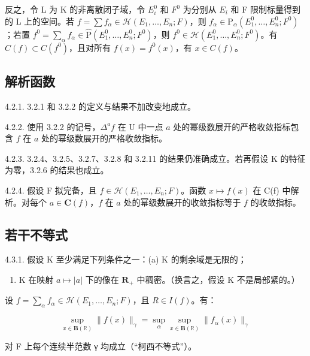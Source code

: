 反之，令 L 为 K 的非离散闭子域，令 \(E_{i}^{0}\) 和 \(F^{0}\) 为分别从 \(E_{i}\) 和 F 限制标量得到的 L 上的空间。若 \(f = \sum f_{\alpha} \in \mathcal{H}(E_{1}, \ldots, E_{n}; F)\)，则 \(f_{\alpha} \in \mathrm{P}_{\alpha}(E_{1}^{0}, \ldots, E_{n}^{0}; F^{0})\)；若置 \(f^{0} = \sum_{\alpha} f_{\alpha} \in \hat{\mathrm{P}}(E_{1}^{0}, \ldots, E_{n}^{0}; F^{0})\)，则 \(f^{0} \in \mathcal{H}(E_{1}^{0}, \ldots, E_{n}^{0}; F^{0})\)。有 \(C(f) \subset C(f^{0})\)，且对所有 \(f(x) = f^{0}(x)\)，有 \(x \in C(f)\)。

\subsection{解析函数}

4.2.1. 3.2.1 和 3.2.2 的定义与结果不加改变地成立。

4.2.2. 使用 3.2.2 的记号，\(\Delta^{a}f\) 在 U 中一点 \(a\) 处的幂级数展开的严格收敛指标包含 \(f\) 在 \(a\) 处的幂级数展开的严格收敛指标。

4.2.3. 3.2.4、3.2.5、3.2.7、3.2.8 和 3.2.11 的结果仍准确成立。若再假设 K 的特征为零，3.2.6 的结果也成立。



4.2.4. 假设 F 拟完备，且 \(f\in\mathcal{H}(E_{1},\ldots,E_{n};F)\)。函数 \(x\mapsto f(x)\) 在 C(f) 中解析。对每个 \(a\in\mathbf{C}(f)\)，\(f\) 在 \(a\) 处的幂级数展开的收敛指标等于 \(f\) 的收敛指标。

\subsection{若干不等式}

4.3.1. 假设 K 至少满足下列条件之一：(a) K 的剩余域是无限的；

\begin{enumerate}
\def\labelenumi{(\alph{enumi})}
\setcounter{enumi}{1}
\tightlist
\item
  K 在映射 \(a \mapsto |a|\) 下的像在 \(\mathbf{R}_{+}\) 中稠密。（换言之，假设 K 不是局部紧的。）
\end{enumerate}

设 \(f = \sum_{\alpha} f_{\alpha} \in \mathcal{H}(E_1, \ldots, E_n; F)\)，且 \(R \in I(f)\)。有：

\[
\sup _ {x \in \mathbf {B} (\mathbb {R})} \| f (x) \| _ {\gamma} = \sup _ {\alpha} \sup _ {x \in \mathbf {B} (\mathbb {R})} \| f _ {\alpha} (x) \| _ {\gamma}
\]

对 F 上每个连续半范数 γ 均成立（“柯西不等式”）。

